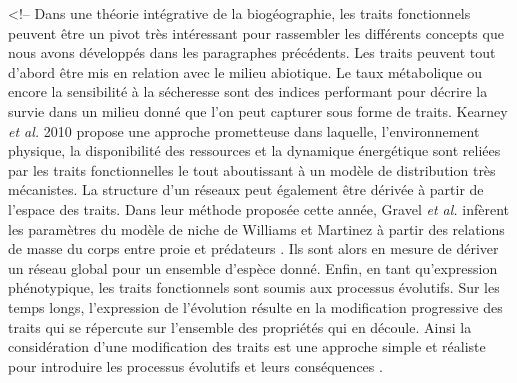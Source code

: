 \textless{}!-- Dans une théorie intégrative de la biogéographie, les
traits fonctionnels peuvent être un pivot très intéressant pour
rassembler les différents concepts que nous avons développés dans les
paragraphes précédents. Les traits peuvent tout d'abord être mis en
relation avec le milieu abiotique. Le taux métabolique ou encore la
sensibilité à la sécheresse sont des indices performant pour décrire la
survie dans un milieu donné \cite{Kearney2004,Engelbrecht2007} que l'on
peut capturer sous forme de traits. Kearney \textit{et al.} 2010 propose
une approche prometteuse dans laquelle, l'environnement physique, la
disponibilité des ressources et la dynamique énergétique sont reliées
par les traits fonctionnelles le tout aboutissant à un modèle de
distribution très mécanistes. La structure d'un réseaux peut également
être dérivée à partir de l'espace des traits. Dans leur méthode proposée
cette année, Gravel \textit{et al.} infèrent les paramètres du modèle de
niche de Williams et Martinez \cite{Williams2000} à partir des relations
de masse du corps entre proie et prédateurs \cite{Gravel2013}. Ils sont
alors en mesure de dériver un réseau global pour un ensemble d'espèce
donné. Enfin, en tant qu'expression phénotypique, les traits
fonctionnels sont soumis aux processus évolutifs. Sur les temps longs,
l'expression de l'évolution résulte en la modification progressive des
traits qui se répercute sur l'ensemble des propriétés qui en découle.
Ainsi la considération d'une modification des traits est une approche
simple et réaliste pour introduire les processus évolutifs et leurs
conséquences \cite{Guill2008,Loeuille2005}.
